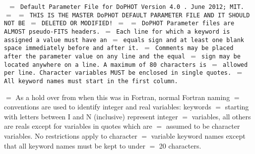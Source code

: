 {\obeylines \baselineskip=12pt \parindent=0pt
{\tt
$=$  Default Parameter File for DoPHOT Version 4.0 .      June 2012; MIT.
$=$
$=$  THIS IS THE MASTER DoPHOT DEFAULT PARAMETER FILE AND IT SHOULD NOT BE
$=$  DELETED OR MODIFIED!
$=$
$=$  DoPHOT Parameter files are ALMOST pseudo-FITS headers.
$=$  Each line for which a keyword is assigned a value must have an
$=$  equals sign and at least one blank space immediately before and after it.
$=$  Comments may be placed after the parameter value on any line and the equal
$=$  sign may be located anywhere on a line.  A maximum of 80 characters is
$=$  allowed per line.  Character variables MUST be enclosed in single quotes.
$=$  All keyword names must start in the first column.

$=$  As a hold over from when this was in Fortran, normal Fortran naming
$=$  conventions are used to identify integer and real variables:  keywords
$=$  starting with letters between I and N (inclusive) represent integer
$=$  variables, all others are reals except for variables in quotes which are
$=$  assumed to be character variables.  No restrictions apply to character
$=$  variable keyword names except that all keyword names must be kept to under
$=$  20 characters.

}}

